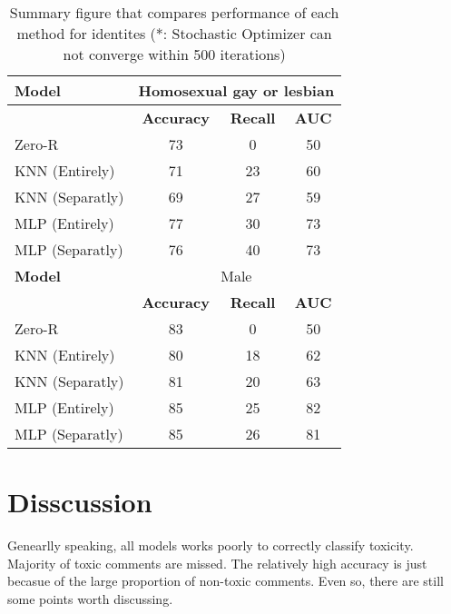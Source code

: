 \documentclass[11pt,twocolumn]{article}
\begin{document}
\begin{table}[h]
\begin{center}
\begin{tabular}{|l |c c c|}
      \textbf{Model}          & \multicolumn{3}{c|}{Homosexual gay or lesbian} \\
      \hline
      \textbf{}          & \textbf{Accuracy} & \textbf{Recall} & \textbf{AUC} \\
      Zero-R                  & 73              & 0             & 50        \\
      KNN (Entirely)          & 71              & 23            & 60      \\
      KNN (Separatly)         & 69              & 27            & 59             \\
      MLP (Entirely)          & 77              & 30            & 73             \\
      MLP (Separatly)         & 76              & 40            & 73             \\
      
      \hline
      \textbf{Model}          & \multicolumn{3}{c|}{Male} \\
      \hline
      \textbf{}          & \textbf{Accuracy} & \textbf{Recall} & \textbf{AUC} \\
      Zero-R                  & 83              & 0             & 50        \\
      KNN (Entirely)          & 80              & 18            & 62      \\
      KNN (Separatly)         & 81              & 20            & 63             \\
      MLP (Entirely)          & 85              & 25            & 82             \\
      MLP (Separatly)         & 85              & 26            & 81             \\
      \hline
      
\end{tabular}
\caption{Summary figure that compares performance of each method for identites (*: Stochastic Optimizer can not converge within 500 iterations)}\label{table6}
\end{center}
\end{table}

\section{Disscussion}
Genearlly speaking, all models works poorly to correctly classify toxicity. Majority of toxic comments are missed. The relatively high accuracy is just becasue of the 
large proportion of non-toxic comments. Even so, there are still some points worth discussing.
\end{document}

